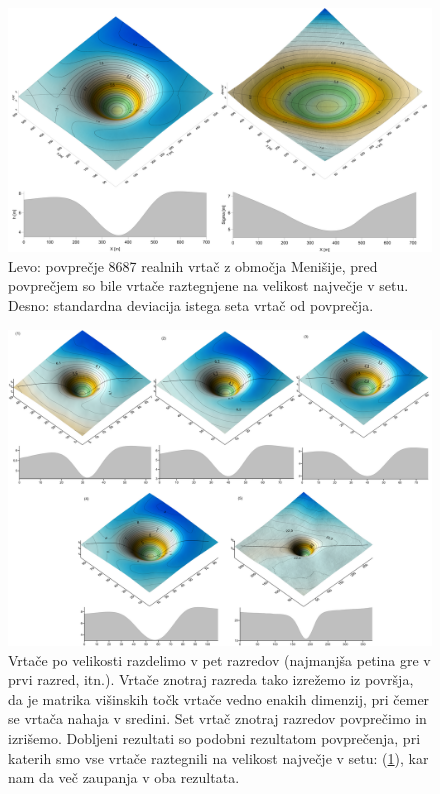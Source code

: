\documentclass[a4paper, twoside, 12pt]{book}
\begin{document}
  \begin{figure}[h!]
    \begin{center}
      \includegraphics[width=14cm]{slike/menisija-vrtaca-sigma}
    \end{center}
    \caption{Levo: povprečje 8687 realnih vrtač z območja Menišije, pred povprečjem so bile vrtače raztegnjene na velikost največje v setu. Desno: standardna deviacija istega seta vrtač od povprečja.}
    \label{fig:menisija-vrtaca}
  \end{figure}

  \begin{figure}[h!]
    \begin{center}
      \includegraphics[width=14cm]{slike/vrtace-po-razredih-menisija}
    \end{center}
    \caption{Vrtače po velikosti razdelimo v pet razredov (najmanjša petina gre v prvi razred, itn.). Vrtače znotraj razreda tako izrežemo iz površja, da je matrika višinskih točk vrtače vedno enakih dimenzij, pri čemer se vrtača nahaja v sredini. Set vrtač znotraj razredov povprečimo in izrišemo. Dobljeni rezultati so podobni rezultatom povprečenja, pri katerih smo vse vrtače raztegnili na velikost največje v setu: (\ref{fig:menisija-vrtaca}), kar nam da več zaupanja v oba rezultata.}
    \label{fig:menisija-vrtace-po-razredih}
  \end{figure}
\end{document}
